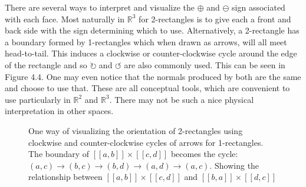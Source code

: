 There are several ways to interpret and visualize the $\oplus$ and $\ominus$ sign associated with each face.
Most naturally in $\mathbb{R}^3$ for 2-rectangles is to give each a front and back side with the sign determining which to use.
Alternatively, a 2-rectangle has a boundary formed by 1-rectangles which when drawn as arrows, will all meet head-to-tail.
This induces a clockwise or counter-clockwise cycle around the edge of the rectangle and so $\circlearrowright$ and $\circlearrowleft$ are also commonly used.
This can be seen in Figure 4.4.
One may even notice that the normals produced by both are the same and choose to use that.
These are all conceptual tools, which are convenient to use particularly in $\mathbb{R}^2$ and $\mathbb{R}^3$.
There may not be such a nice physical interpretation in other spaces.


\begin{figure}[ht]
\caption[Orientations of 2-rectangles]{One way of visualizing the orientation of 2-rectangles using clockwise and counter-clockwise cycles of arrows for 1-rectangles. 
The boundary of $[\![a,b]\!] \times [\![c,d]\!]$ becomes the cycle: 
$(a,c) \to (b,c) \to (b,d) \to (a,d) \to (a,c)$.
Showing the relationship between $[\![a,b]\!] \times [\![c,d]\!]$ and $[\![b,a]\!] \times [\![d,c]\!]$ }
\centering
{}
\end{figure}




